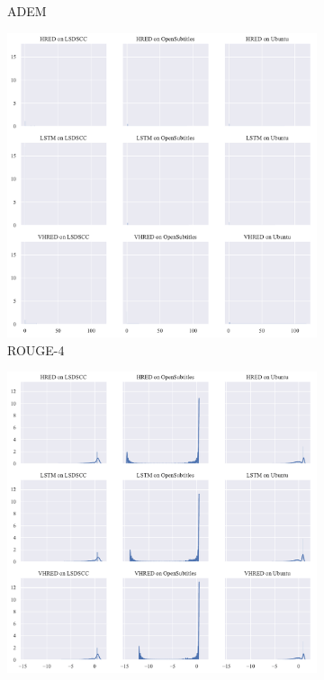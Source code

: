 \begin{figure}[H]
\begin{subfigure}{0.33\linewidth}
        \centering
        \caption{ADEM}
    \end{subfigure}%
    \begin{subfigure}{0.33\linewidth}
        \centering
        \includegraphics[width=\linewidth]{figure/distplot_grid/rouge_4/plot.pdf}
        \caption{ROUGE-4}
    \end{subfigure}
    \begin{subfigure}{0.33\linewidth}
        \centering
        \includegraphics[width=\linewidth]{figure/distplot_grid/distinct_1/plot.pdf}

\end{subfigure}
\end{figure}
